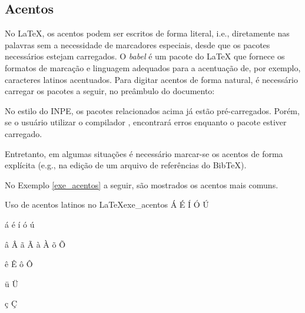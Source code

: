 \subsection{Acentos}
\label{sec:acentos}

No \LaTeX{}, os acentos podem ser escritos de forma literal, i.e., diretamente nas palavras sem a necessidade de marcadores especiais, desde que os pacotes necessários estejam carregados. O \textit{babel} é um pacote do \LaTeX{} que fornece os formatos de marcação e linguagem adequados para a acentuação de, por exemplo, caracteres latinos acentuados. Para digitar acentos de forma natural, é necessário carregar os pacotes a seguir, no preâmbulo do documento:

\begin{itemize}
    \item \texttt{\usepackage[brazilian]{babel}}
    \item \texttt{\usepackage[utf8]{inputenc}}\footnotemark[1]
    \item \texttt{\usepackage[T1]{fontenc}}
\end{itemize}


\begin{marker}
  No estilo do INPE, os pacotes relacionados acima já estão pré-carregados. Porém, se o usuário utilizar o compilador \XeLaTeX{}, encontrará erros enquanto o pacote estiver carregado.
\end{marker}

Entretanto, em algumas situações é necessário marcar-se os acentos de forma explícita (e.g., na edição de um arquivo de referências do BibTeX).

No Exemplo \ref{exe_acentos} a seguir, são mostrados os acentos mais comuns.

\begin{texexptitled}[breakable,center lower,enhanced,middle=2mm,listing side text]{Uso de acentos latinos no \LaTeX{}}{exe_acentos}
\'A \'E \'I \'O \'U

\'a \'e \'i \'o \'u

\^a \^A \~a \~A \`a \`A \~o \~O

\^e \^E \^o \^O

\"u \"U

\c{c} \c{C}
\end{texexptitled}

